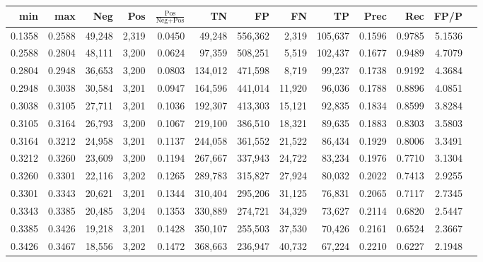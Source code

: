 \begin{tabular}{rrrrrrrrrrrrr}
\toprule
   min &    max &    Neg &   Pos & $\frac{\text{Pos}}{\text{Neg}+\text{Pos}}$ &      TN &      FP &      FN &      TP &   Prec &    Rec &   FP/P \\
\midrule
0.1358 & 0.2588 & 49,248 & 2,319 &                                     0.0450 &  49,248 & 556,362 &   2,319 & 105,637 & 0.1596 & 0.9785 & 5.1536 \\
0.2588 & 0.2804 & 48,111 & 3,200 &                                     0.0624 &  97,359 & 508,251 &   5,519 & 102,437 & 0.1677 & 0.9489 & 4.7079 \\
0.2804 & 0.2948 & 36,653 & 3,200 &                                     0.0803 & 134,012 & 471,598 &   8,719 &  99,237 & 0.1738 & 0.9192 & 4.3684 \\
0.2948 & 0.3038 & 30,584 & 3,201 &                                     0.0947 & 164,596 & 441,014 &  11,920 &  96,036 & 0.1788 & 0.8896 & 4.0851 \\
0.3038 & 0.3105 & 27,711 & 3,201 &                                     0.1036 & 192,307 & 413,303 &  15,121 &  92,835 & 0.1834 & 0.8599 & 3.8284 \\
0.3105 & 0.3164 & 26,793 & 3,200 &                                     0.1067 & 219,100 & 386,510 &  18,321 &  89,635 & 0.1883 & 0.8303 & 3.5803 \\
0.3164 & 0.3212 & 24,958 & 3,201 &                                     0.1137 & 244,058 & 361,552 &  21,522 &  86,434 & 0.1929 & 0.8006 & 3.3491 \\
0.3212 & 0.3260 & 23,609 & 3,200 &                                     0.1194 & 267,667 & 337,943 &  24,722 &  83,234 & 0.1976 & 0.7710 & 3.1304 \\
0.3260 & 0.3301 & 22,116 & 3,202 &                                     0.1265 & 289,783 & 315,827 &  27,924 &  80,032 & 0.2022 & 0.7413 & 2.9255 \\
0.3301 & 0.3343 & 20,621 & 3,201 &                                     0.1344 & 310,404 & 295,206 &  31,125 &  76,831 & 0.2065 & 0.7117 & 2.7345 \\
0.3343 & 0.3385 & 20,485 & 3,204 &                                     0.1353 & 330,889 & 274,721 &  34,329 &  73,627 & 0.2114 & 0.6820 & 2.5447 \\
0.3385 & 0.3426 & 19,218 & 3,201 &                                     0.1428 & 350,107 & 255,503 &  37,530 &  70,426 & 0.2161 & 0.6524 & 2.3667 \\
0.3426 & 0.3467 & 18,556 & 3,202 &                                     0.1472 & 368,663 & 236,947 &  40,732 &  67,224 & 0.2210 & 0.6227 & 2.1948 \\

\end{tabular}
